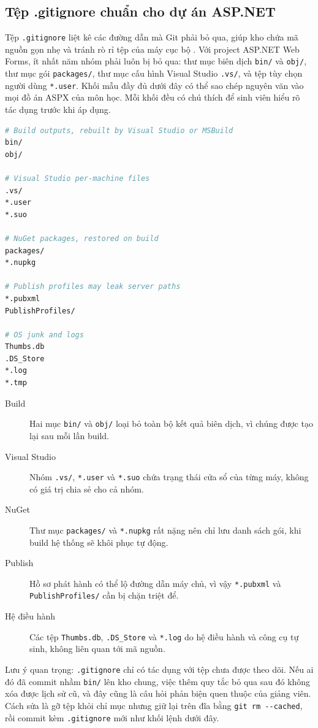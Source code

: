\subsection{Tệp .gitignore chuẩn cho dự án ASP.NET}

Tệp \verb|.gitignore| liệt kê các đường dẫn mà Git phải bỏ qua, giúp kho chứa mã nguồn gọn nhẹ và tránh rò rỉ tệp của máy cục bộ \cite{githubdocs}. Với project ASP.NET Web Forms, ít nhất năm nhóm phải luôn bị bỏ qua: thư mục biên dịch \verb|bin/| và \verb|obj/|, thư mục gói \verb|packages/|, thư mục cấu hình Visual Studio \verb|.vs/|, và tệp tùy chọn người dùng \verb|*.user|. Khối mẫu đầy đủ dưới đây có thể sao chép nguyên văn vào mọi đồ án ASPX của môn học. Mỗi khối đều có chú thích để sinh viên hiểu rõ tác dụng trước khi áp dụng.

\begin{lstlisting}[language=bash, caption={Mẫu gitignore đầy đủ cho ASP.NET Web Forms}, label={lst:c23-gitignore}]
# Build outputs, rebuilt by Visual Studio or MSBuild
bin/
obj/

# Visual Studio per-machine files
.vs/
*.user
*.suo

# NuGet packages, restored on build
packages/
*.nupkg

# Publish profiles may leak server paths
*.pubxml
PublishProfiles/

# OS junk and logs
Thumbs.db
.DS_Store
*.log
*.tmp
\end{lstlisting}

\begin{description}
\item[Build] Hai mục \verb|bin/| và \verb|obj/| loại bỏ toàn bộ kết quả biên dịch, vì chúng được tạo lại sau mỗi lần build.
\item[Visual Studio] Nhóm \verb|.vs/|, \verb|*.user| và \verb|*.suo| chứa trạng thái cửa sổ của từng máy, không có giá trị chia sẻ cho cả nhóm.
\item[NuGet] Thư mục \verb|packages/| và \verb|*.nupkg| rất nặng nên chỉ lưu danh sách gói, khi build hệ thống sẽ khôi phục tự động.
\item[Publish] Hồ sơ phát hành có thể lộ đường dẫn máy chủ, vì vậy \verb|*.pubxml| và \verb|PublishProfiles/| cần bị chặn triệt để.
\item[Hệ điều hành] Các tệp \verb|Thumbs.db|, \verb|.DS_Store| và \verb|*.log| do hệ điều hành và công cụ tự sinh, không liên quan tới mã nguồn.
\end{description}

Lưu ý quan trọng: \verb|.gitignore| chỉ có tác dụng với tệp chưa được theo dõi. Nếu ai đó đã commit nhầm \verb|bin/| lên kho chung, việc thêm quy tắc bỏ qua sau đó không xóa được lịch sử cũ, và đây cũng là câu hỏi phản biện quen thuộc của giảng viên. Cách sửa là gỡ tệp khỏi chỉ mục nhưng giữ lại trên đĩa bằng \verb|git rm --cached|, rồi commit kèm \verb|.gitignore| mới như khối lệnh dưới đây.

